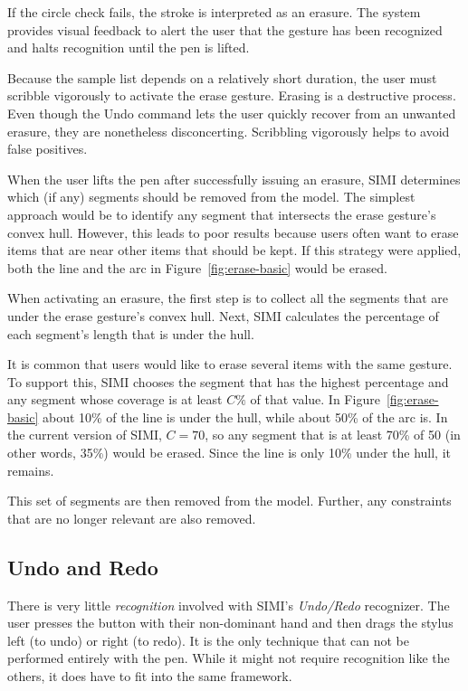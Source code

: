 If the circle check fails, the stroke is interpreted as an
erasure. The system provides visual feedback to alert the user that
the gesture has been recognized and halts recognition until the pen is
lifted.

Because the sample list depends on a relatively short duration, the
user must scribble vigorously to activate the erase gesture. Erasing
is a destructive process. Even though the Undo command lets the user
quickly recover from an unwanted erasure, they are nonetheless
disconcerting. Scribbling vigorously helps to avoid false positives.

When the user lifts the pen after successfully issuing an erasure,
SIMI determines which (if any) segments should be removed from the
model. The simplest approach would be to identify any segment that
intersects the erase gesture's convex hull. However, this leads to
poor results because users often want to erase items that are near
other items that should be kept. If this strategy were applied, both
the line and the arc in Figure~\ref{fig:erase-basic} would be erased.

When activating an erasure, the first step is to collect all the
segments that are under the erase gesture's convex hull. Next, SIMI
calculates the percentage of each segment's length that is under the
hull.

It is common that users would like to erase several items with the
same gesture. To support this, SIMI chooses the segment that has the
highest percentage and any segment whose coverage is at least $C\%$ of
that value. In Figure~\ref{fig:erase-basic} about 10\% of the line is
under the hull, while about 50\% of the arc is. In the current version
of SIMI, $C=70$, so any segment that is at least 70\% of 50 (in other
words, 35\%) would be erased. Since the line is only 10\% under the
hull, it remains.

This set of segments are then removed from the model. Further, any
constraints that are no longer relevant are also removed.



\subsection{Undo and Redo}

There is very little \textit{recognition} involved with SIMI's
\textit{Undo/Redo} recognizer. The user presses the button with their
non-dominant hand and then drags the stylus left (to undo) or right
(to redo). It is the only technique that can not be performed entirely
with the pen. While it might not require recognition like the others,
it does have to fit into the same framework.

